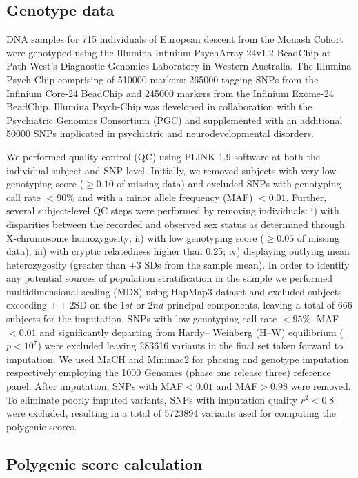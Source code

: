 \subsection{Genotype data}

DNA samples for 715 individuals of European descent from the Monash Cohort were genotyped using the Illumina Infinium PsychArray-24v1.2 BeadChip at Path West’s Diagnostic Genomics Laboratory in Western Australia. The Illumina Psych-Chip comprising of \num{510000} markers: \num{265000} tagging SNPs from the Infinium Core-24 BeadChip and \num{245000} markers from the Infinium Exome-24 BeadChip. Illumina Psych-Chip was developed in collaboration with the Psychiatric Genomics Consortium (PGC) and supplemented with an additional \num{50000} SNPs implicated in psychiatric and neurodevelopmental disorders.

We performed quality control (QC) using PLINK 1.9 software at both the individual subject and SNP level. Initially, we removed subjects with very low-genotyping score ($\geq 0.10$ of missing data) and excluded SNPs with genotyping call rate $<90\%$ and with a minor allele frequency (MAF) $< 0.01$. Further, several subject-level QC steps were performed by removing individuals: i) with disparities between the recorded and observed sex status as determined through X-chromosome homozygosity; ii) with low genotyping score ($\geq 0.05$ of missing data); iii) with cryptic relatedness higher than 0.25; iv) displaying outlying mean heterozygosity (greater than $\pm3$ SDs from the sample mean). In order to identify any potential sources of population stratification in the sample we performed multidimensional scaling (MDS) using HapMap3 dataset \citep{Consortium2010} and excluded subjects exceeding $\pm±2$SD on the $1st$ or $2nd$ principal components, leaving a total of 666 subjects for the imputation. SNPs with low genotyping call rate $<95\%$, MAF$<0.01$ and significantly departing from Hardy– Weinberg (H–W) equilibrium ($p<10^{7}$) were excluded leaving \num{283 616} variants in the final set taken forward to imputation. We used MaCH and Minimac2 for phasing and genotype imputation respectively employing the 1000 Genomes (phase one release three) reference panel. After imputation, SNPs with MAF$<0.01$ and MAF$>0.98$ were removed. To eliminate poorly imputed variants, SNPs with imputation quality $r^{2} < 0.8$ were excluded, resulting in a total of \num{5723894} variants used for computing the polygenic scores.

\subsection{Polygenic score calculation}

